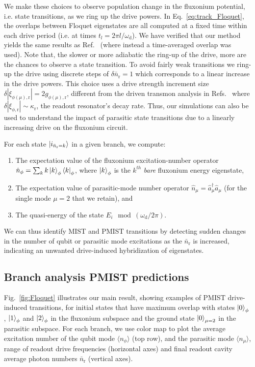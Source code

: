 \documentclass[%
reprint,
superscriptaddress,
 amsmath,amssymb,
 aps,
 prx,
longbibliography,
floatfix,
]{revtex4-2}
\begin{document}
We make these choices to observe population change in the fluxonium potential, i.e. state transitions, as we ring up the drive powers. In Eq.~\ref{eq:track_Floquet}, the overlaps between Floquet eigenstates are all computed at a fixed time within each drive period (i.e. at times $t_l = 2 \pi l/ \omega_\textrm{d}$).  We have verified that our method yields the same results as Ref.~\cite{dumas2024unified} (where instead a time-averaged overlap was used). Note that, the slower or more adiabatic the ring-up of the drive, more are the chances to observe a state transition. To avoid fairly weak transitions we ring-up the drive using discrete steps of $\delta \bar n_\textrm{r}=1$ which corresponds to a linear increase in the drive powers. This choice uses a drive strength increment size $\delta 
|{\xi}_{\phi (
\mu
),\textrm{r}}|= 2g_{
\phi(\mu),\textrm{r}} 
$, different from the driven transmon analysis in Refs.~\cite{dumas2024unified} where $\delta 
|{\xi}_{\phi,\textrm{r}}|\sim \kappa_\textrm{r}$, the readout resonator's decay rate. Thus, our simulations can also be used to understand the impact of parasitic state transitions due to a linearly increasing drive on the fluxonium circuit.



For each state $\ket{i_{\bar n_\textrm{r}=k}}$ in a given branch, we compute:
\begin{enumerate}
    \item The expectation value of the fluxonium excitation-number operator $\hat n_\phi=\sum_k k\ket{k}_\phi\bra{k}_\phi$,  where $\ket{k}_\phi$ is the $k^{th}$ {\it bare} fluxonium energy eigenstate,
    \item The expectation value of parasitic-mode number operator $\hat n_\mu=\hat a_{\mu}^\dagger \hat a_{\mu}$ (for the single mode $\mu=2$ that we retain), and 
    \item The quasi-energy of the state $E_i \mod (\omega_\textrm{d}/2\pi)$.
\end{enumerate}
We can thus identify MIST and PMIST transitions by detecting sudden changes in the number of qubit or parasitic mode excitations as the $\bar{n}_\textrm{r}$ is increased, indicating an unwanted drive-induced hybridization of eigenstates.  


\subsection{Branch analysis PMIST predictions}

Fig.~\ref{fig:Floquet} illustrates our main result, showing examples of PMIST drive-induced transitions,   
for initial states that have maximum overlap with states $\ket{0}_\phi$, $\ket{1}_\phi$ and $\ket{2}_\phi$ in the fluxonium subspace and the ground state $\ket{0}_{\mu=2}$ in the parasitic subspace. 
For each branch, we use color map to plot the average excitation number of the qubit mode $\langle n_\phi \rangle$ (top row), and the parasitic mode $\langle n_\mu \rangle$, range of readout drive frequencies (horizontal axes) and final readout cavity average photon numbers $ \bar n_\textrm{r}$ (vertical axes). 
\end{document}
